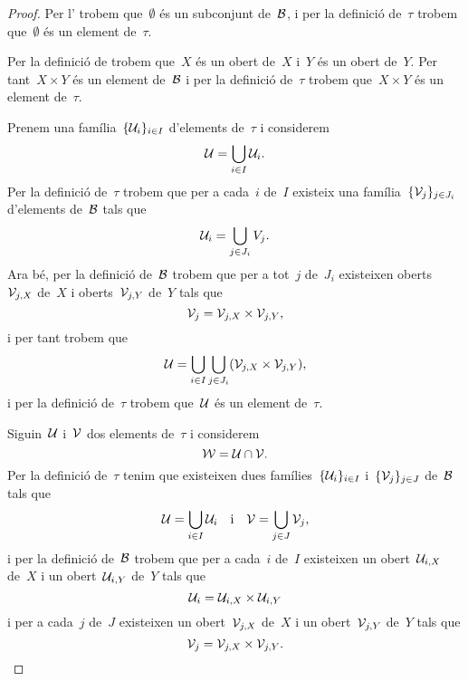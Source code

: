 \documentclass[../topologia.tex]{subfiles}
\begin{document}
    \begin{proof}
        Per l' trobem que~\(\emptyset\) és un subconjunt de~\(\mathcal{B}\), i per la definició de~\(\tau\) trobem que~\(\emptyset\) és un element de~\(\tau\).

        Per la definició de  trobem que~\(X\) és un obert de~\(X\) i~\(Y\) és un obert de~\(Y\).
        Per tant~\(X\times Y\) és un element de~\(\mathcal{B}\) i per la definició de~\(\tau\) trobem que~\(X\times Y\) és un element de~\(\tau\).

        Prenem una família~\(\{\mathcal{U}_{i}\}_{i\in I}\) d'elements de~\(\tau\) i considerem
        \[
            \mathcal{U}=\bigcup_{i\in I}\mathcal{U}_{i}.
        \]
        Per la definició de~\(\tau\) trobem que per a cada~\(i\) de~\(I\) existeix una família~\(\{\mathcal{V}_{j}\}_{j\in J_{i}}\) d'elements de~\(\mathcal{B}\) tals que
        \[
            \mathcal{U}_{i}=\bigcup_{j\in J_{i}}V_{j}.
        \]
        Ara bé, per la definició de~\(\mathcal{B}\) trobem que per a tot~\(j\) de~\(J_{i}\) existeixen oberts~\(\mathcal{V}_{j,X}\) de~\(X\) i oberts~\(\mathcal{V}_{j,Y}\) de~\(Y\) tals que
        \[
            \mathcal{V}_{j}=\mathcal{V}_{j,X}\times\mathcal{V}_{j,Y},
        \]
        i per tant trobem que
        \[
            \obert{U}=\bigcup_{i\in I}\bigcup_{j\in J_{i}}\left(\obert{V}_{j,X}\times\obert{V}_{j,Y}\right),
        \]
        i per la definició de~\(\tau\) trobem que~\(\mathcal{U}\) és un element de~\(\tau\).

        Siguin~\(\mathcal{U}\) i~\(\mathcal{V}\) dos elements de~\(\tau\) i considerem
        \[
            \mathcal{W}=\mathcal{U}\cap\mathcal{V}.
        \]
        Per la definició de~\(\tau\) tenim que existeixen dues famílies~\(\{\mathcal{U}_{i}\}_{i\in I}\) i~\(\{\mathcal{V}_{j}\}_{j\in J}\) de~\(\mathcal{B}\) tals que
        \[
            \mathcal{U}=\bigcup_{i\in I}\mathcal{U}_{i}\quad\text{i}\quad\mathcal{V}=\bigcup_{j\in J}\mathcal{V}_{j},
        \]
        i per la definició de~\(\mathcal{B}\) trobem que per a cada~\(i\) de~\(I\) existeixen un obert~\(\mathcal{U}_{i,X}\) de~\(X\) i un obert~\(\mathcal{U}_{i,Y}\) de~\(Y\) tals que
        \[
            \mathcal{U}_{i}=\mathcal{U}_{i,X}\times\mathcal{U}_{i,Y}
        \]
        i per a cada~\(j\) de~\(J\) existeixen un obert~\(\mathcal{V}_{j,X}\) de~\(X\) i un obert~\(\mathcal{V}_{j,Y}\) de~\(Y\) tals que
        \[
            \mathcal{V}_{j}=\mathcal{V}_{j,X}\times\mathcal{V}_{j,Y}.
        \]


\end{proof}
\end{document}
